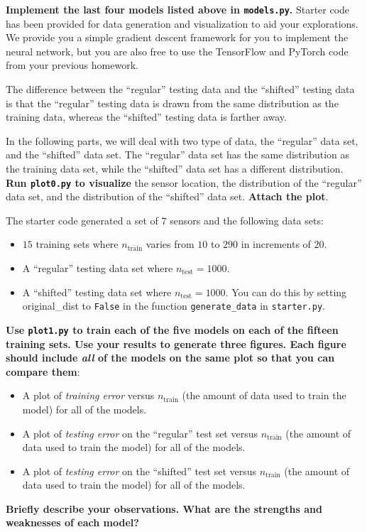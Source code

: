 \documentclass[preview]{standalone}
\begin{document}
\begin{Parts}

\Part \textbf{Implement the last four models listed above in
\texttt{models.py}.} Starter code has been provided for data generation and
visualization to aid your explorations.  We provide you a simple gradient
descent framework for you to implement the neural network, but you are also
free to use the TensorFlow and PyTorch code from your previous homework.

The difference between the ``regular'' testing data and the ``shifted'' testing
data is that the ``regular'' testing data is drawn from the same distribution
as the training data, whereas the ``shifted'' testing data is farther away.

\Part In the following parts, we will deal with two type of data, the
``regular'' data set, and the ``shifted'' data set.  The ``regular'' data set
has the same distribution as the training data set, while the ``shifted'' data
set has a different distribution.  \textbf{Run \texttt{plot0.py} to visualize}
the sensor location, the distribution of the ``regular'' data set, and the
distribution of the ``shifted'' data set.  \textbf{Attach the plot}.



\Part \label{pt:models} The starter code generated a set of $7$ sensors and the
following data sets:
\begin{itemize}
    \item $15$ training sets where $n_\text{train}$ varies from $10$ to $290$
        in increments of $20$.
    \item A ``regular'' testing data set where $n_\text{test} = 1000$.
    \item A ``shifted'' testing data set where $n_\text{test} = 1000$. You can
        do this by setting original\_dist to \texttt{False} in the function
        \texttt{generate\_data} in \texttt{starter.py}.
\end{itemize}

\textbf{Use \texttt{plot1.py} to train each of the five models on each of
the fifteen training sets. Use your results to generate three figures.  Each
figure should include \emph{all} of the models on the same plot so that you can
compare them}:
\begin{itemize}
    \item A plot of \emph{training error} versus $n_\text{train}$ (the amount
        of data used to train the model) for all of the models.
    \item A plot of \emph{testing error} on the ``regular'' test set versus
        $n_\text{train}$ (the amount of data used to train the model) for all
        of the models.
    \item A plot of \emph{testing error} on the ``shifted'' test set versus
        $n_\text{train}$ (the amount of data used to train the model) for all
        of the models.
\end{itemize}
\textbf{Briefly describe your observations. What are the strengths and
weaknesses of each model?}




\end{Parts}
\end{document}
